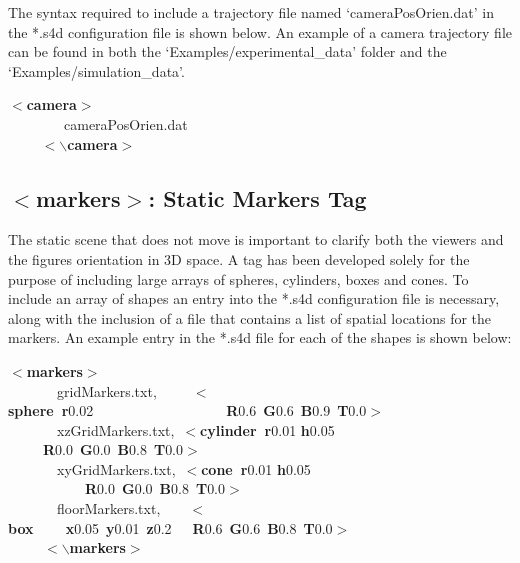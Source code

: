 \documentclass[singlecolumn,12pt]{article}
\newcommand{\hlstd}[1]{\textcolor[rgb]{0,0,0}{#1}}
\newcommand{\hlkey}[1]{\textcolor[rgb]{0,0,1}{\bf{#1}}}
\newcommand{\hlnum}[1]{\textcolor[rgb]{0.66,0,0.66}{#1}}
\begin{document}
The syntax required to include a trajectory file named
`cameraPosOrien.dat' in the *.s4d configuration file is shown below.
An example of a camera trajectory file can be found in both the
`Examples/experimental\_data' folder and the
`Examples/simulation\_data'.

\vspace{1cm}
\hlkey{$<$camera$>$}\hlstd{\\
\hlstd{\ \ \ \ \ \ \ \ }cameraPosOrien.dat\\
}\hlstd{\ \ \ \ } \hlkey{$<$$\backslash$camera$>$} \vspace{1cm}

\subsection{$<$markers$>$: Static Markers Tag}

The static scene that does not move is important to clarify both the
viewers and the figures orientation in 3D space. A tag has been
developed solely for the purpose of including large arrays of
spheres, cylinders, boxes and cones. To include an array of shapes
an entry into the *.s4d configuration file is necessary, along with
the inclusion of a file that contains a list of spatial locations
for the markers. An example entry in the *.s4d file for each of the
shapes is shown below:

\vspace{1cm}
\hlkey{$<$markers$>$}\hlstd{\\
\hlstd{\ \ \ \ \ \ \ }gridMarkers.txt,\hlstd{\ \ \ \ \  }}\hlkey{$<$sphere\ r}\hlnum{0.02\hlstd{\ \ \ \ \ \ \ \ \ \ \ \ \ \ \ \ \ \ \ }}\hlkey{R}\hlnum{0.6\ }\hlkey{G}\hlnum{0.6\ }\hlkey{B}\hlnum{0.9\ }\hlkey{T}\hlnum{0.0}\hlkey{$>$}\hlstd{\\
\hlstd{\ \ \ \ \ \ \ }xzGridMarkers.txt,\ }\hlkey{$<$cylinder\ r}\hlnum{0.01} \hlkey{h}\hlnum{0.05} \hlstd{\ \ \ \ \ }\hlkey{R}\hlnum{0.0\ }\hlkey{G}\hlnum{0.0\ }\hlkey{B}\hlnum{0.8\ }\hlkey{T}\hlnum{0.0}\hlkey{$>$}\hlstd{\\
\hlstd{\ \ \ \ \ \ \ }xyGridMarkers.txt,\ }\hlkey{$<$cone\ r}\hlnum{0.01} \hlkey{h}\hlnum{0.05} \hlstd{\ \ \ \ \ \ \ \ \ \ \ }\hlkey{R}\hlnum{0.0\ }\hlkey{G}\hlnum{0.0\ }\hlkey{B}\hlnum{0.8\ }\hlkey{T}\hlnum{0.0}\hlkey{$>$}\hlstd{\\
\hlstd{\ \ \ \ \ \ \ }floorMarkers.txt,\hlstd{\ \ \ \ }}\hlkey{$<$box\hlstd{\ \ \ \ }x}\hlnum{0.05\ }\hlkey{y}\hlnum{0.01\ }\hlkey{z}\hlnum{0.2\hlstd{\ \ \ }}\hlkey{R}\hlnum{0.6\ }\hlkey{G}\hlnum{0.6\ }\hlkey{B}\hlnum{0.8\ }\hlkey{T}\hlnum{0.0}\hlkey{$>$}\hlstd{\\
}\hlstd{\ \ \ \ \ }\hlkey{$<$$\backslash$markers$>$}
\vspace{1cm}
\end{document}
